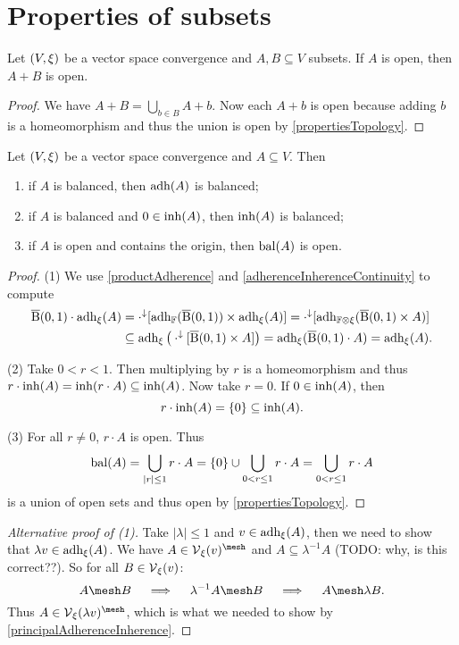 \section{Properties of subsets}
\begin{lemma} \label{sumOpenSetsOpen}
Let $\sSet{V,\xi}$ be a vector space convergence and $A,B\subseteq V$ subsets. If $A$ is open, then $A+B$ is open.
\end{lemma}
\begin{proof}
We have $A + B = \bigcup_{b\in B} A+b$. Now each $A+b$ is open because adding $b$ is a homeomorphism and thus the union is open by \ref{propertiesTopology}.
\end{proof}

\begin{proposition} \label{inherenceAdherenceBalanced}
Let $\sSet{V,\xi}$ be a vector space convergence and $A\subseteq V$. Then
\begin{enumerate}
\item if $A$ is balanced, then $\operatorname{adh}(A)$ is balanced;
\item if $A$ is balanced and $0\in\operatorname{inh}(A)$, then $\operatorname{inh}(A)$ is balanced;
\item if $A$ is open and contains the origin, then $\operatorname{bal}(A)$ is open.
\end{enumerate}
\end{proposition}
\begin{proof}
(1) We use \ref{productAdherence} and \ref{adherenceInherenceContinuity} to compute
\begin{align*}
\operatorname{\overline{B}}(0,1)\cdot \operatorname{adh}_\xi(A) &= \cdot^\downarrow[\operatorname{adh}_{\mathbb{F}}(\operatorname{\overline{B}}(0,1))\times \operatorname{adh}_\xi(A)] = \cdot^\downarrow[\operatorname{adh}_{\mathbb{F}\otimes \xi}(\operatorname{\overline{B}}(0,1)\times A)] \\
&\subseteq \operatorname{adh}_{\xi}\big(\cdot^\downarrow[\operatorname{\overline{B}}(0,1)\times A]\big) = \operatorname{adh}_{\xi}(\operatorname{\overline{B}}(0,1)\cdot A) = \operatorname{adh}_\xi(A).
\end{align*}

(2) Take $0<r<1$. Then multiplying by $r$ is a homeomorphism and thus $r\cdot\operatorname{inh}(A) = \operatorname{inh}(r\cdot A) \subseteq \operatorname{inh}(A)$. Now take $r=0$. If $0\in\operatorname{inh}(A)$, then
\[ r\cdot\operatorname{inh}(A) = \{0\} \subseteq \operatorname{inh}(A). \]

(3) For all $r\neq 0$, $r\cdot A$ is open. Thus
\[ \operatorname{bal}(A) = \bigcup_{|r|\leq 1}r\cdot A = \{0\}\cup \bigcup_{0< r\leq 1}r\cdot A = \bigcup_{0< r\leq 1}r\cdot A \]
is a union of open sets and thus open by \ref{propertiesTopology}.
\end{proof}
\begin{proof}[Alternative proof of (1)]
Take $|\lambda|\leq 1$ and $v\in \operatorname{adh}_\xi(A)$, then we need to show that $\lambda v \in \operatorname{adh}_\xi(A)$. We have $A\in \vicinity_\xi(v)^{\mesh}$ and $A\subseteq \lambda^{-1}A$ (TODO: why, is this correct??). So for all $B\in \operatorname{\mathcal{V}}_\xi(v)$:
\[ A\mesh B \quad\implies\quad \lambda^{-1}A\mesh B \quad\implies\quad A\mesh \lambda B. \]
Thus $A\in \vicinity_\xi(\lambda v)^{\mesh}$, which is what we needed to show by \ref{principalAdherenceInherence}.
\end{proof}

